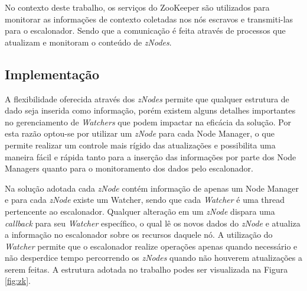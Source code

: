 No contexto deste trabalho, os serviços do ZooKeeper são utilizados para monitorar as informações de contexto coletadas nos nós escravos e transmiti-las para o escalonador. Sendo que a comunicação é feita através de processos que atualizam e monitoram o conteúdo de \textit{zNodes}.

\subsection{Implementação}
A flexibilidade oferecida através dos \textit{zNodes} permite que qualquer estrutura de dado seja inserida como informação, porém existem alguns detalhes importantes no gerenciamento de \textit{Watchers} que podem impactar na eficácia da solução. Por esta razão optou-se por utilizar um \textit{zNode} para cada Node Manager, o que permite realizar um controle mais rígido das atualizações e possibilita uma maneira fácil e rápida tanto para a inserção das informações por parte dos Node Managers quanto para o monitoramento dos dados pelo escalonador.

Na solução adotada cada \textit{zNode} contém informação de apenas um Node Manager e para cada \textit{zNode} existe um Watcher, sendo que cada \textit{Watcher} é uma thread pertencente ao escalonador. Qualquer alteração em um \textit{zNode} dispara uma \textit{callback} para seu \textit{Watcher} específico, o qual lê os novos dados do \textit{zNode} e atualiza a informação no escalonador sobre os recursos daquele nó. A utilização do \textit{Watcher} permite que o escalonador realize operações apenas quando necessário e não desperdice tempo percorrendo os \textit{zNodes} quando não houverem atualizações a serem feitas. A estrutura adotada no trabalho podes ser visualizada na Figura \ref{fig:zk}.




